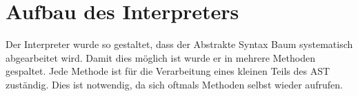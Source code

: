 
\section{Aufbau des Interpreters}
Der Interpreter wurde so gestaltet, dass der Abstrakte Syntax Baum systematisch abgearbeitet wird. Damit dies möglich ist wurde er in mehrere Methoden gespaltet. Jede Methode ist für die Verarbeitung eines kleinen Teils des AST zuständig. Dies ist notwendig, da sich oftmals Methoden selbst wieder aufrufen.

